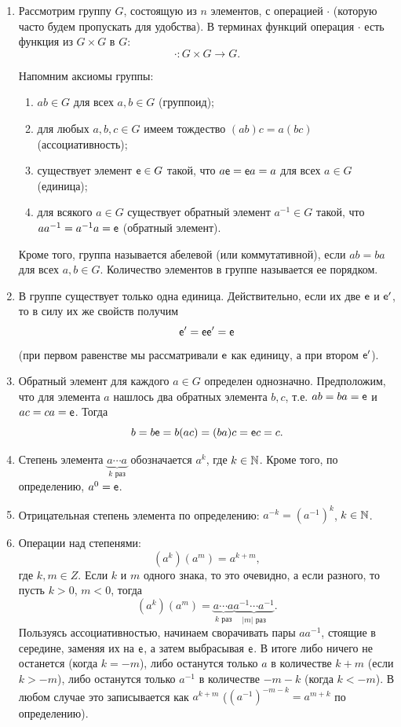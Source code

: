 \begin{enumerate}
\item Рассмотрим группу $G$, состоящую из $n$ элементов, с операцией $\cdot$ (которую часто будем пропускать для удобства). В терминах функций операция $\cdot$ есть функция из $G\times G$ в $G$:
$$
\cdot: G\times G\to G.
$$

Напомним аксиомы группы:
\begin{enumerate}[G1]
\item $ab\in G$ для всех $a,b\in G$ (группоид);
\item для любых $a,b,c\in G$ имеем тождество $(ab)c=a(bc)$ (ассоциативность);
\item существует элемент $\mathsf e\in G$ такой, что $a\mathsf e=\mathsf e a=a$ для всех $a\in G$ (единица);
\item для всякого $a\in G$ существует обратный элемент $a^{-1}\in G$ такой, что $aa^{-1}=a^{-1}a=\mathsf e$ (обратный элемент).
\end{enumerate}
Кроме того, группа называется абелевой (или коммутативной), если $ab=ba$ для всех $a,b\in G$. Количество элементов в группе называется ее порядком.
\item В группе существует только одна единица. Действительно, если их две $\mathsf e$ и $\mathsf e'$, то в силу их же свойств получим
$$
\mathsf e' = \mathsf e\mathsf e' = \mathsf e
$$
(при первом равенстве мы рассматривали $\mathsf e$ как единицу, а при втором $\mathsf e'$).
\item Обратный элемент для каждого $a\in G$ определен однозначно. Предположим, что для элемента $a$ нашлось два обратных элемента $b,c$, т.е. $ab=ba=\mathsf e$ и $ac=ca=\mathsf e$. Тогда
$$
b=b\mathsf e=b(ac)=(ba)c=\mathsf e c=c.
$$
\item Степень элемента $\underbrace{a\cdots a}_{k\mbox{ раз}}$ обозначается $a^k$, где $k\in\mathbb N$. Кроме того, по определению, $a^0=\mathsf e$.
\item Отрицательная степень элемента по определению: $a^{-k}=(a^{-1})^k$, $k\in\mathbb N$.
\item Операции над степенями:
$$
(a^k)(a^m)=a^{k+m},
$$
где $k,m\in Z$. Если $k$ и $m$ одного знака, то это очевидно, а если разного, то пусть $k>0$, $m<0$, тогда
$$
(a^k)(a^m) = \underbrace{a\cdots a}_{k\mbox{ раз}}\underbrace{a^{-1}\cdots a^{-1}}_{|m|\mbox{ раз}}.
$$
Пользуясь ассоциативностью, начинаем сворачивать пары $aa^{-1}$, стоящие в середине, заменяя их на $\mathsf e$, а затем выбрасывая $\mathsf e$. В итоге либо ничего не останется (когда $k=-m$), либо останутся только $a$ в количестве $k+m$ (если $k>-m$), либо останутся только $a^{-1}$ в количестве $-m-k$ (когда $k<-m$). В любом случае это записывается как $a^{k+m}$ ($(a^{-1})^{-m-k}=a^{m+k}$ по определению).


\end{enumerate}
